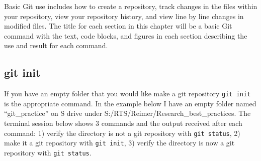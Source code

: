 \documentclass[
  letterpaper,
  DIV=11,
  numbers=noendperiod]{scrreprt}
\newenvironment{Shaded}{\begin{snugshade}}{\end{snugshade}}
\newcommand{\NormalTok}[1]{\textcolor[rgb]{0.00,0.23,0.31}{#1}}
\begin{document}
Basic Git use includes how to create a repository, track changes in the
files within your repository, view your repository history, and view
line by line changes in modified files. The title for each section in
this chapter will be a basic Git command with the text, code blocks, and
figures in each section describing the use and result for each command.

\hypertarget{git-init}{%
\subsection{git init}\label{git-init}}

If you have an empty folder that you would like make a git repository
\texttt{git\ init} is the appropriate command. In the example below I
have an empty folder named ``git\_practice'' on S drive under
S:/RTS/Reimer/Research\_best\_practices. The terminal session below
shows 3 commands and the output received after each command: 1) verify
the directory is not a git repository with \texttt{git\ status}, 2) make
it a git repository with \texttt{git\ init}, 3) verify the directory is
now a git repository with \texttt{git\ status}.

\begin{Shaded}
\end{Shaded}
\end{document}
